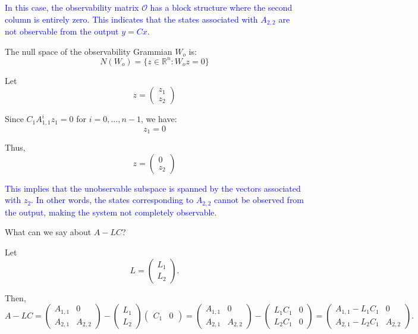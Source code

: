 \documentclass{article}
\begin{document}
\textcolor{blue}{
In this case, the observability matrix $\mathcal{O}$ has a block structure where the second column is entirely zero. This indicates that the states associated with $A_{2,2}$ are not observable from the output $y = Cx$.
}

The null space of the observability Grammian $W_o$ is:
\[
N(W_o) = \{ z \in \mathbb{R}^n : W_o z = 0 \}
\]

Let
\[
z = \begin{pmatrix}
z_1 \\
z_2
\end{pmatrix}
\]

Since $C_1 A_{1,1}^i z_1 = 0$ for $i = 0, \ldots, n-1$, we have:
\[
z_1 = 0
\]

Thus,
\[
z = \begin{pmatrix}
0 \\
z_2
\end{pmatrix}
\]

\textcolor{blue}{
This implies that the unobservable subspace is spanned by the vectors associated with $z_2$. In other words, the states corresponding to $A_{2,2}$ cannot be observed from the output, making the system not completely observable.
}

What can we say about \(A - LC\)?

Let
\[
L = \begin{pmatrix}
L_1 \\
L_2
\end{pmatrix}.
\]

Then,
\[
A - LC = \begin{pmatrix}
A_{1,1} & 0 \\
A_{2,1} & A_{2,2}
\end{pmatrix} - \begin{pmatrix}
L_1 \\
L_2
\end{pmatrix} \begin{pmatrix}
C_1 & 0
\end{pmatrix}
= \begin{pmatrix}
A_{1,1} & 0 \\
A_{2,1} & A_{2,2}
\end{pmatrix} - \begin{pmatrix}
L_1 C_1 & 0 \\
L_2 C_1 & 0
\end{pmatrix}
= \begin{pmatrix}
A_{1,1} - L_1 C_1 & 0 \\
A_{2,1} - L_2 C_1 & A_{2,2}
\end{pmatrix}.
\]
\end{document}
